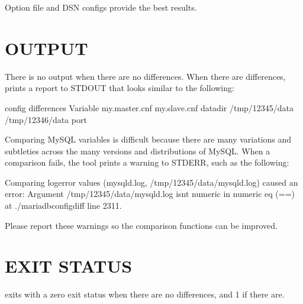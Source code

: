 \documentclass[letterpaper,10pt,english]{sphinxmanual}
\begin{document}
Option file and DSN configs provide the best results.


\section{OUTPUT}
\label{\detokenize{mariadb-config-diff:output}}
There is no output when there are no differences.  When there are differences,
 prints a report to STDOUT that looks similar to the following:

\begin{sphinxVerbatim}[commandchars=\\\{\}]
 config differences
Variable                  my.master.cnf   my.slave.cnf
  
datadir                   /tmp/12345/data /tmp/12346/data
port                                 
\end{sphinxVerbatim}

Comparing MySQL variables is difficult because there are many variations and
subtleties across the many versions and distributions of MySQL.  When a
comparison fails, the tool prints a warning to STDERR, such as the following:

\begin{sphinxVerbatim}[commandchars=\\\{\}]
Comparing log\PYGZus{}error values (mysqld.log, /tmp/12345/data/mysqld.log)
caused an error: Argument \PYGZdq{}/tmp/12345/data/mysqld.log\PYGZdq{} isn\PYGZsq{}t numeric
in numeric eq (==) at ./mariadb\PYGZhy{}config\PYGZhy{}diff line 2311.
\end{sphinxVerbatim}

Please report these warnings so the comparison functions can be improved.


\section{EXIT STATUS}
\label{\detokenize{mariadb-config-diff:exit-status}}
 exits with a zero exit status when there are no differences, and
1 if there are.
\end{document}
